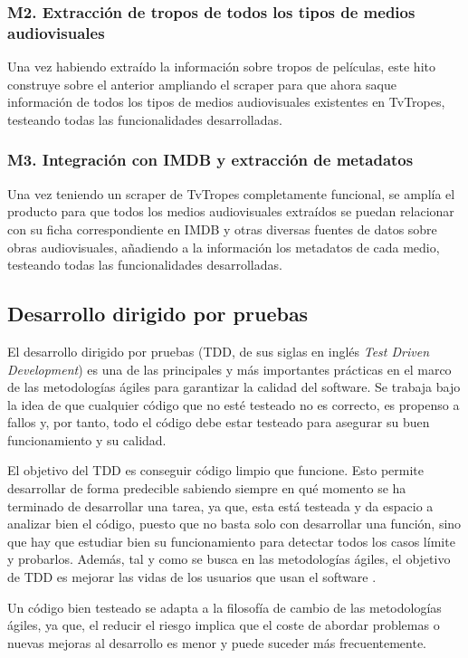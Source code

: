 \subsubsection{M2. Extracción de tropos de todos los tipos de medios audiovisuales}
Una vez habiendo extraído la información sobre tropos de películas, este hito construye sobre el anterior ampliando el scraper para que ahora saque información de todos los tipos de medios audiovisuales existentes en TvTropes, testeando todas las funcionalidades desarrolladas.

\subsubsection{M3. Integración con IMDB y extracción de metadatos}
Una vez teniendo un scraper de TvTropes completamente funcional, se amplía el producto para que todos los medios audiovisuales extraídos se puedan relacionar con su ficha correspondiente en IMDB y otras diversas fuentes de datos sobre obras audiovisuales, añadiendo a la información los metadatos de cada medio, testeando todas las funcionalidades desarrolladas.

\subsection{Desarrollo dirigido por pruebas}
El desarrollo dirigido por pruebas (TDD, de sus siglas en inglés \textit{Test Driven Development}) es una de las principales y más importantes prácticas en el marco de las metodologías ágiles para garantizar la calidad del software. Se trabaja bajo la idea de que cualquier código que no esté testeado no es correcto, es propenso a fallos y, por tanto, todo el código debe estar testeado para asegurar su buen funcionamiento y su calidad.

El objetivo del TDD es conseguir código limpio que funcione. Esto permite desarrollar de forma predecible sabiendo siempre en qué momento se ha terminado de desarrollar una tarea, ya que, esta está testeada y da espacio a analizar bien el código, puesto que no basta solo con desarrollar una función, sino que hay que estudiar bien su funcionamiento para detectar todos los casos límite y probarlos. Además, tal y como se busca en las metodologías ágiles, el objetivo de TDD es mejorar las vidas de los usuarios que usan el software \cite{beck2002driven}.

Un código bien testeado se adapta a la filosofía de cambio de las metodologías ágiles, ya que, el reducir el riesgo implica que el coste de abordar problemas o nuevas mejoras al desarrollo es menor y puede suceder más frecuentemente.\\

